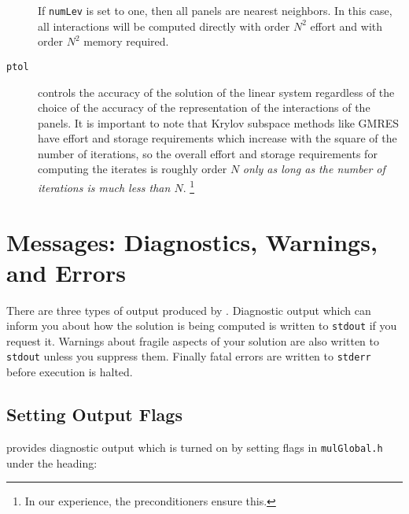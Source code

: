 \begin{description}


If {\tt numLev} is set to one, then all panels are nearest neighbors.
In this case, all interactions will be computed directly with 
order $N^2$ effort and with order $N^2$ memory required. 

\item[{\tt *ptol}] controls the accuracy of the solution of the linear system
regardless of the choice of the accuracy of the representation of the 
interactions of the panels.  It is important to note that Krylov 
subspace methods like GMRES have effort and storage requirements which
increase with the square of the number of iterations, so the overall
effort and storage requirements for computing the iterates is roughly
order $N$ {\it only as long as the number of iterations is much less than $N$}.
\footnote{In our experience, the preconditioners ensure this.}
\end{description} 

\newpage
\section{Messages: Diagnostics, Warnings, and Errors}
\label{s:mess}

There are three types of output produced by \fas.  Diagnostic output
which can inform you about how the solution is being computed is written 
to {\tt stdout} if you request it.  Warnings about fragile aspects of your
solution are also written to {\tt stdout} unless you suppress them.  Finally
fatal errors are written to {\tt stderr} before execution is halted.

\subsection{Setting Output Flags}
\label{ss:setting}

\fas provides diagnostic output which is turned on by setting flags
in {\tt mulGlobal.h} under the heading:

